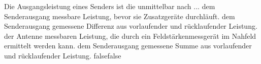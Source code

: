     {Die Ausgangsleistung eines Senders ist die unmittelbar nach ...}
    {dem Senderausgang messbare Leistung, bevor sie Zusatzgeräte durchläuft.}
    {dem Senderausgang gemessene Differenz aus vorlaufender und rücklaufender Leistung.}
    {der Antenne messbaren Leistung, die durch ein Feldstärkenmessgerät im Nahfeld ermittelt werden kann.}
    {dem Senderausgang gemessene Summe aus vorlaufender und rücklaufender Leistung.}
    {false}{false}